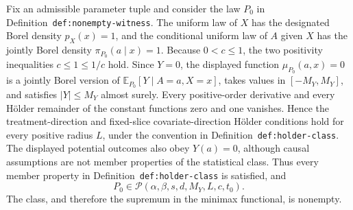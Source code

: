 Fix an admissible parameter tuple and consider the law \(P_0\) in Definition~\texttt{def:nonempty-witness}. The uniform law of \(X\) has the designated Borel density \(p_X(x)=1\), and the conditional uniform law of \(A\) given \(X\) has the jointly Borel density \(\pi_{P_0}(a\mid x)=1\). Because \(0<c\le 1\), the two positivity inequalities \(c\le1\le1/c\) hold. Since \(Y=0\), the displayed function \(\mu_{P_0}(a,x)=0\) is a jointly Borel version of \(\mathbb E_{P_0}[Y\mid A=a,X=x]\), takes values in \([-M_Y,M_Y]\), and satisfies \(\lvert Y\rvert\le M_Y\) almost surely. Every positive-order derivative and every Hölder remainder of the constant functions zero and one vanishes. Hence the treatment-direction and fixed-slice covariate-direction Hölder conditions hold for every positive radius \(L\), under the convention in Definition~\texttt{def:holder-class}. The displayed potential outcomes also obey \(Y(a)=0\), although causal assumptions are not member properties of the statistical class. Thus every member property in Definition~\texttt{def:holder-class} is satisfied, and
\[
P_0\in\mathcal P(\alpha,\beta,s,d,M_Y,L,c,t_0).
\]
The class, and therefore the supremum in the minimax functional, is nonempty.